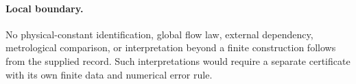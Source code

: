 \paragraph{Local boundary.}
No physical-constant identification, global flow law, external dependency, metrological comparison, or interpretation beyond a finite construction follows from the supplied record. Such interpretations would require a separate certificate with its own finite data and numerical error rule.